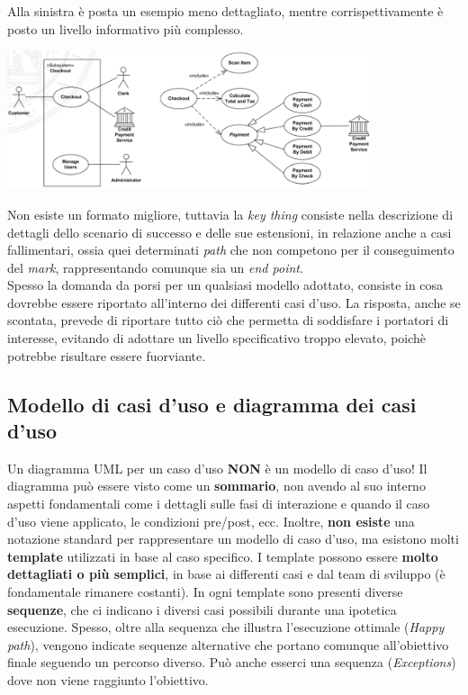 \documentclass{article}
\begin{document}
Alla sinistra è posta un esempio meno dettagliato, mentre corrispettivamente è posto un livello informativo più complesso.\vspace*{14pt}
\begin{center}
    \includegraphics[width=0.8\textwidth]{foto 1.png}
\end{center}
\pagebreak
Non esiste un formato migliore, tuttavia la \textit{key thing} consiste nella descrizione di dettagli dello scenario di successo e delle sue estensioni, in relazione anche a casi fallimentari,  ossia quei determinati \textit{path} che non competono per il conseguimento del \textit{mark}, rappresentando comunque sia un \textit{end point}.\\
Spesso la domanda da porsi per un qualsiasi modello adottato, consiste in cosa dovrebbe essere riportato all'interno dei differenti casi d'uso. La risposta, anche se scontata, prevede di riportare tutto ciò che permetta di soddisfare i portatori di interesse, evitando di adottare un livello specificativo troppo elevato, poichè potrebbe risultare essere fuorviante.

\subsection*{Modello di casi d'uso e diagramma dei casi d'uso}
\large
Un diagramma UML per un caso d'uso \textbf{NON} è un modello di caso d'uso! Il diagramma può essere visto come un \textbf{sommario}, non avendo al suo interno aspetti fondamentali come i dettagli sulle fasi di interazione e quando il caso d'uso viene applicato, le condizioni pre/post, ecc. Inoltre, \textbf{non esiste} una notazione standard per rappresentare un modello di caso d'uso, ma esistono molti \textbf{template} utilizzati in base al caso specifico. I template possono essere \textbf{molto dettagliati o più semplici}, in base ai differenti casi e dal team di sviluppo (è fondamentale rimanere costanti). In ogni template sono presenti diverse \textbf{sequenze}, che ci indicano i diversi casi possibili durante una ipotetica esecuzione. Spesso, oltre alla sequenza che illustra l'esecuzione ottimale (\textit{Happy path}), vengono indicate sequenze alternative che portano comunque all'obiettivo finale seguendo un percorso diverso. Può anche esserci una sequenza (\textit{Exceptions}) dove non viene raggiunto l'obiettivo.
\end{document}
